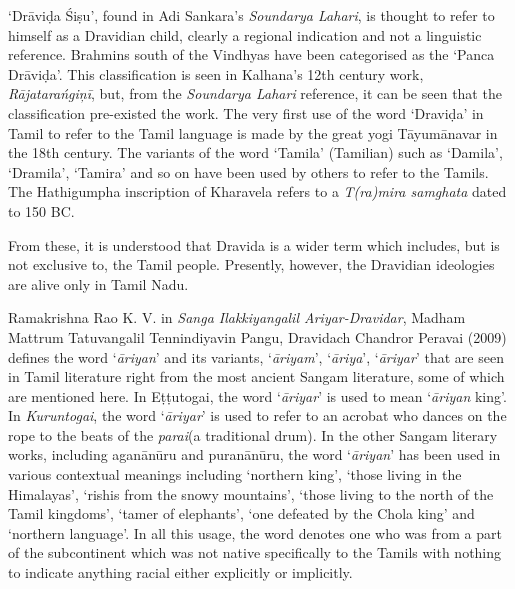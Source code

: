 ‘Drāviḍa Śiṣu’, found in Adi Sankara’s \textit{Soundarya Lahari}, is thought to refer to himself as a Dravidian child, clearly a regional indication and not a linguistic reference. Brahmins south of the Vindhyas have been categorised as the ‘Panca Drāviḍa’. This classification is seen in Kalhana’s 12th century work, \textit{Rājatarańgiņī}, but, from the \textit{Soundarya Lahari} reference, it can be seen that the classification pre-existed the work. The very first use of the word ‘Draviḍa’ in Tamil to refer to the Tamil language is made by the great yogi Tāyumānavar in the 18th century. The variants of the word ‘Tamila’ (Tamilian) such as ‘Damila’, ‘Dramila’, ‘Tamira’ and so on have been used by others to refer to the Tamils. The Hathigumpha inscription of Kharavela refers to a \textit{T(ra)mira samghata} dated to 150 BC.

From these, it is understood that Dravida is a wider term which includes, but is not exclusive to, the Tamil people. Presently, however, the Dravidian ideologies are alive only in Tamil Nadu.

Ramakrishna Rao K. V. in \textit{Sanga Ilakkiyangalil Ariyar-Dravidar}, Madham Mattrum Tatuvangalil Tennindiyavin Pangu, Dravidach Chandror Peravai (2009) defines the word ‘\textit{āriyan}’ and its variants, ‘\textit{āriyam}’, ‘\textit{āriya}’, ‘\textit{āriyar}’ that are seen in Tamil literature right from the most ancient Sangam literature, some of which are mentioned here. In Eṭṭutogai, the word ‘\textit{āriyar}’ is used to mean ‘\textit{āriyan} king’. In \textit{Kuruntogai}, the word ‘\textit{āriyar}’ is used to refer to an acrobat who dances on the rope to the beats of the \textit{parai}(a traditional drum). In the other Sangam literary works, including aganānūru and puranānūru, the word ‘\textit{āriyan}’ has been used in various contextual meanings including ‘northern king’, ‘those living in the Himalayas’, ‘rishis from the snowy mountains’, ‘those living to the north of the Tamil kingdoms’, ‘tamer of elephants’, ‘one defeated by the Chola king’ and ‘northern language’. In all this usage, the word denotes one who was from a part of the subcontinent which was not native specifically to the Tamils with nothing to indicate anything racial either explicitly or implicitly.

